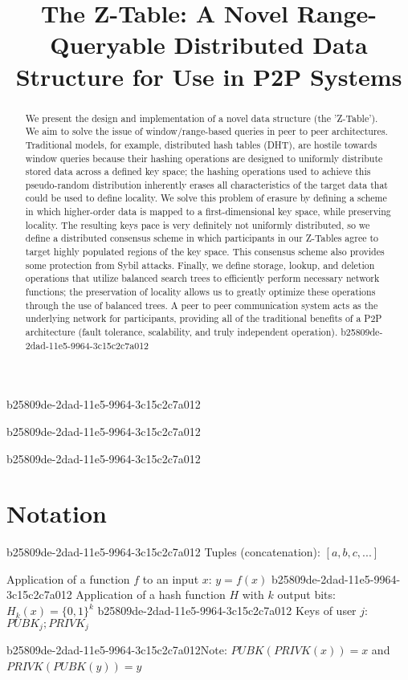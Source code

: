 \documentclass[12pt]{article}
\title{The Z-Table: A Novel Range-Queryable Distributed Data Structure for Use in P2P Systems}
\begin{document}
b25809de-2dad-11e5-9964-3c15c2c7a012
\maketitle
b25809de-2dad-11e5-9964-3c15c2c7a012
\begin{abstract}
We present the design and implementation of a novel data structure (the 'Z-Table'). We aim to solve the issue of window/range-based queries in peer to peer architectures. Traditional models, for example,  distributed hash tables (DHT), are hostile towards window queries because their hashing operations are designed to uniformly distribute stored data across a defined key space; the hashing operations used to achieve this pseudo-random distribution inherently erases all characteristics of the target data that could be used to define locality. We solve this problem of erasure by defining a scheme in which higher-order data is mapped to a first-dimensional key space, while preserving locality. The resulting keys pace is very definitely not uniformly distributed, so we define a distributed consensus scheme in which participants in our Z-Tables agree to target highly populated regions of the key space. This consensus scheme also provides some protection from Sybil attacks. Finally, we define storage, lookup, and deletion operations that utilize balanced search trees to efficiently perform necessary network functions; the preservation of locality allows us to greatly optimize these operations through the use of balanced trees. A peer to peer communication system acts as the underlying network for participants, providing all of the traditional benefits of a P2P architecture (fault tolerance, scalability, and truly independent operation).
b25809de-2dad-11e5-9964-3c15c2c7a012\end{abstract}

b25809de-2dad-11e5-9964-3c15c2c7a012\section{Notation}
b25809de-2dad-11e5-9964-3c15c2c7a012
Tuples (concatenation): $[a,b,c,...]$

Application of a function $f$ to an input $x$: $y=f(x)$
b25809de-2dad-11e5-9964-3c15c2c7a012
Application of a hash function $H$ with $k$ output bits: $H_{k}(x) = \{0,1\}^k$
b25809de-2dad-11e5-9964-3c15c2c7a012
Keys of user $j$: $ PUBK_j; PRIVK_j $

b25809de-2dad-11e5-9964-3c15c2c7a012Note: $PUBK(PRIVK(x)) = x$ and $PRIVK(PUBK(y)) = y$~
\end{document}
